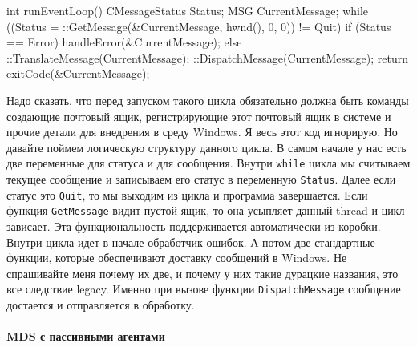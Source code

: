 \begin{cppcode}
int runEventLoop() {
  CMessageStatus Status;
  MSG CurrentMessage;
  while ((Status = ::GetMessage(&CurrentMessage, hwnd(), 0, 0)) != Quit) {
    if (Status == Error)
      handleError(&CurrentMessage);
    else
      ::TranslateMessage(CurrentMessage);
      ::DispatchMessage(CurrentMessage);
  }
  return exitCode(&CurrentMessage);
}
\end{cppcode}
Надо сказать, что перед запуском такого цикла обязательно должна быть команды создающие почтовый ящик, регистрирующие этот почтовый ящик в системе и прочие детали для внедрения в среду Windows.
Я весь этот код игнорирую.
Но давайте поймем  логическую структуру данного цикла.
В самом начале у нас есть две переменные для статуса и для сообщения.
Внутри \verb"while" цикла мы считываем текущее сообщение и записываем его статус в переменную \verb"Status".
Далее если статус это \verb"Quit", то мы выходим из цикла и программа завершается.
Если функция \verb"GetMessage" видит пустой ящик, то она усыпляет данный thread и цикл зависает.
Эта функциональность поддерживается автоматически из коробки.
Внутри цикла идет в начале обработчик ошибок.
А потом две стандартные функции, которые обеспечивают доставку сообщений в Windows.
Не спрашивайте меня почему их две, и почему у них такие дурацкие названия, это все следствие legacy.
Именно при вызове функции \verb"DispatchMessage" сообщение достается и отправляется в обработку.

\paragraph{MDS с пассивными агентами}

